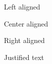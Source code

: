 Left aligned

\begin{center}
Center aligned\end{center}
\begin{flushright}
Right aligned\end{flushright}
Justified text

